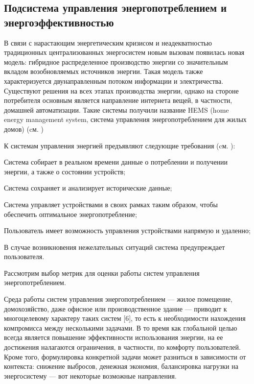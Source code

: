 \subsection{Подсистема управления энергопотреблением и энергоэффективностью}
В связи с нарастающим энергетическим кризисом и неадекватностью традиционных централизованных энергосистем новым вызовам появилась новая модель: гибридное распределенное производство энергии со значительным вкладом возобновляемых источников энергии. Такая модель также характеризуется двунаправленным потоком информации и электричества. Существуют решения на всех этапах производства энергии, однако на стороне потребителя основным является направление интернета вещей, в частности, домашней автоматизации. Такие системы получили название HEMS (home energy management system, система управления энергопотреблением для жилых домов) (cм. )

К системам управления энергией предъявляют следующие требования (cм. ):

\begin{textitemize}
	\item Система собирает в реальном времени данные о потреблении и получении энергии, а также о состоянии устройств;
	\item Система сохраняет и анализирует исторические данные;
	\item Система управляет устройствами в своих рамках таким образом, чтобы обеспечить оптимальное энергопотребление;
	\item Пользователь имеет возможность управления устройствами напрямую и удаленно;
	\item В случае возникновения нежелательных ситуаций система предупреждает пользователя.
\end{textitemize}

Рассмотрим выбор метрик для оценки работы систем управления энергопотреблением.

Среда работы систем управления энергопотреблением --- жилое помещение, домохозяйство, даже офисное или производственное здание --- приводит к многоцелевому характеру таких систем [6], то есть к необходимости нахождения компромисса между несколькими задачами. В то время как глобальной целью всегда является повышение эффективности использования энергии, на ее достижения налагаются ограничения, в частности, по комфорту пользователей. Кроме того, формулировка конкретной задачи может разниться в зависимости от контекста: снижение выбросов, денежная экономия, балансировка нагрузки на энергосистему — вот некоторые возможные направления.

